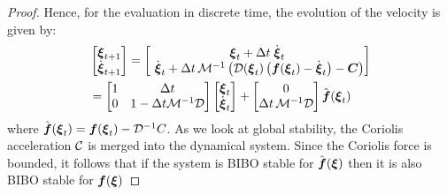 \begin{proof}
Hence, for the evaluation in discrete time, the evolution of the velocity is given by:
\begin{equation}
	\begin{split}
	& \begin{bmatrix}
	 \vecs \xi_{t+1} \\ \dot{\vecs \xi}_{t+1}
	\end{bmatrix}
	=
	\begin{bmatrix}
		\vect \xi_t + \Delta t  \; \dot{\vect \xi}_t \\ \
		\dot{\vecs \xi}_t + \Delta t \, \matd{M}^{-1} \left( \matd{D}(\vect \xi_t) \left( \vect f(\vecs \xi_t) - \dot{\vecs \xi}_t \right) - \matr C \right)
	\end{bmatrix} \\
	&  = %
	\begin{bmatrix}
		1 & \Delta t \\
		0 & 1 - \Delta t \matd{M}^{-1} \matd D 
	\end{bmatrix}
	\begin{bmatrix}
		\vect \xi_t \\ \dot{\vect \xi}_t
	\end{bmatrix}
	+ \begin{bmatrix}
		0 \\ 
		\Delta t \, \matd{M}^{-1} \matd{D} 
	\end{bmatrix}
	\hat{\vect f}(\vecs \xi_t) 
	\label{eq:discrete_time_proof}
	\end{split}
\end{equation}
where $\hat{\boldsymbol{f}}(\boldsymbol{\xi}_t) = \boldsymbol{f}(\boldsymbol{\xi}_t) - \mathcal{D}^{-1} C$. 
As we look at global stability, the Coriolis acceleration $\mathcal{C}$ is merged into the dynamical system. Since the Coriolis force is bounded, it follows that if the system is BIBO stable for $\hat{\boldsymbol{f}}(\boldsymbol{\xi})$ then it is also BIBO stable for $\boldsymbol{f}(\boldsymbol{\xi})$ 


\end{proof}
